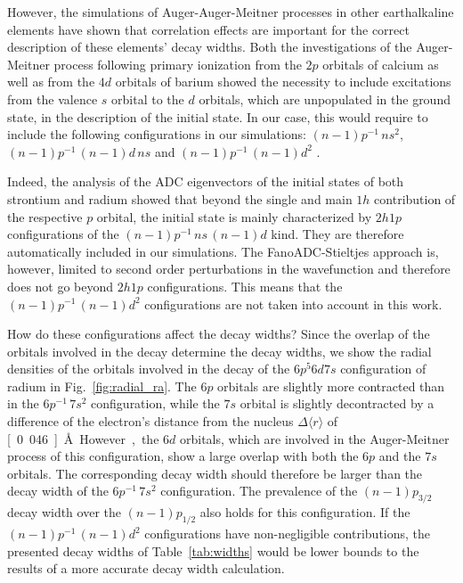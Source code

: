 However, the simulations of Auger-Auger-Meitner processes in other earthalkaline elements
have shown that correlation effects are important for the correct
description of these elements' decay widths. Both the investigations of
the Auger-Meitner process following primary ionization
from the $2p$ orbitals of calcium \cite{Nikkinen05}
as well as from the $4d$ orbitals of barium \cite{Rose80}
showed the necessity to include excitations from the valence $s$ orbital to
the $d$ orbitals, which are unpopulated in the ground state, in the
description of the initial state.
In our case, this would require to include the following configurations in our
simulations:
 $(n-1)p^{-1} \,ns^2$,
 $(n-1)p^{-1} \,(n-1)d \, ns$ and
 $(n-1)p^{-1} \,(n-1)d^2$ .    

Indeed, the analysis of the ADC eigenvectors of the initial states of both
strontium and radium showed
that beyond the single and main $1h$ contribution of the respective $p$ orbital, the
initial state is mainly characterized by $2h1p$ configurations of the
$(n-1)p^{-1} \,ns \, (n-1)d$ kind. They
are therefore automatically included in our simulations.
The FanoADC-Stieltjes approach is, however, limited
to second order perturbations in the wavefunction
and therefore does not go beyond $2h1p$ configurations. This means that the
$(n-1)p^{-1} \,(n-1)d^2$ configurations are not taken into account in this work.

How do these configurations affect the decay widths? Since the overlap of the
orbitals involved in the decay determine the decay widths, we show the
radial densities of the orbitals involved in the decay of the $6p^5 6d 7s$
configuration of radium in Fig.~\ref{fig:radial_ra}.
The $6p$ orbitals are slightly more contracted than in the $6p^{-1} \,7s^2$
configuration, while the $7s$ orbital is slightly decontracted by a difference
of the electron's distance from the nucleus $\Delta \langle r \rangle$
of \unit[0.046]{\AA}.
However, the $6d$ orbitals, which are involved
in the Auger-Meitner process of this configuration, show a large overlap with both
the $6p$ and the $7s$ orbitals. The corresponding decay width should therefore
be larger than the decay width of the $6p^{-1} \,7s^2$ configuration.
The prevalence of the $(n-1)p_{3/2}$ decay width over the $(n-1)p_{1/2}$
also holds for this configuration.
If the $(n-1)p^{-1} \,(n-1)d^2$ configurations
have non-negligible contributions,
the presented decay widths of Table~\ref{tab:widths} would be
lower bounds to the results of a more accurate decay width calculation.


